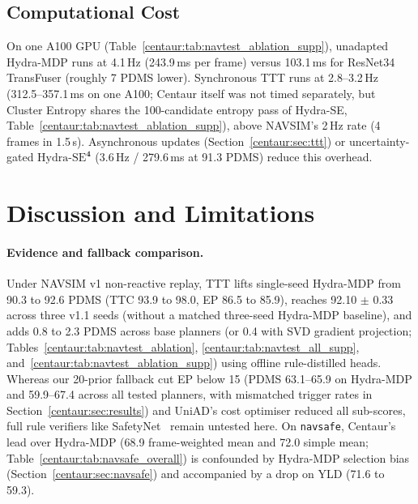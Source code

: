 \subsection{Computational Cost}\label{centaur:sec:latency}

On one A100 GPU (Table~\ref{centaur:tab:navtest_ablation_supp}), unadapted Hydra-MDP runs at 4.1\,Hz (243.9\,ms per frame) versus 103.1\,ms for ResNet34 TransFuser (roughly 7 PDMS lower). Synchronous TTT runs at 2.8--3.2\,Hz (312.5--357.1\,ms on one A100; Centaur itself was not timed separately, but Cluster Entropy shares the 100-candidate entropy pass of Hydra-SE, Table~\ref{centaur:tab:navtest_ablation_supp}), above NAVSIM's 2\,Hz rate (4 frames in 1.5\,s). Asynchronous updates (Section~\ref{centaur:sec:ttt}) or uncertainty-gated $\text{Hydra-SE}^{\mathbf{4}}$ (3.6\,Hz / 279.6\,ms at 91.3 PDMS) reduce this overhead.

\section{Discussion and Limitations}\label{centaur:sec:discussion}

\paragraph{Evidence and fallback comparison.} Under NAVSIM v1 non-reactive replay, TTT lifts single-seed Hydra-MDP from 90.3 to 92.6 PDMS (TTC 93.9 to 98.0, EP 86.5 to 85.9), reaches 92.10 $\pm$ 0.33 across three v1.1 seeds (without a matched three-seed Hydra-MDP baseline), and adds 0.8 to 2.3 PDMS across base planners (or 0.4 with SVD gradient projection; Tables~\ref{centaur:tab:navtest_ablation}, \ref{centaur:tab:navtest_all_supp}, and~\ref{centaur:tab:navtest_ablation_supp}) using offline rule-distilled heads. Whereas our 20-prior fallback cut EP below 15 (PDMS 63.1--65.9 on Hydra-MDP and 59.9--67.4 across all tested planners, with mismatched trigger rates in Section~\ref{centaur:sec:results}) and UniAD's cost optimiser reduced all sub-scores, full rule verifiers like SafetyNet~\cite{vitelli2022safetynet} remain untested here. On \texttt{navsafe}, Centaur's lead over Hydra-MDP (68.9  frame-weighted mean and 72.0  simple mean; Table~\ref{centaur:tab:navsafe_overall}) is confounded by Hydra-MDP selection bias (Section~\ref{centaur:sec:navsafe}) and accompanied by a drop on YLD (71.6 to 59.3).

